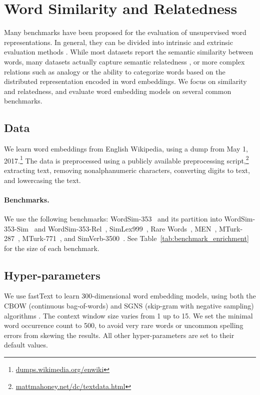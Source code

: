 \documentclass[11pt,a4paper]{article}
\begin{document}
    \section{Word Similarity and Relatedness}\label{sec:benchmarks}
    
    Many benchmarks have been proposed for the evaluation of unsupervised word
    representations.
    In general, they can be divided into intrinsic and extrinsic evaluation methods
    \cite{schnabel2015evaluation,chiu2016intrinsic,jastrzebski2017evaluate,alshargi2018concept2vec,bakarov2018survey}.
    While most datasets report the semantic similarity between words,
    many datasets actually capture semantic relatedness
    \cite{hill2015simlex,avraham2016improving},
    or more complex relations such as analogy or the ability to categorize
    words based on the distributed representation encoded in word embeddings.
    We focus on similarity and relatedness, and evaluate word embedding models
    on several common benchmarks.
    
    \subsection{Data}\label{sec:data}
    We learn word embeddings from English Wikipedia,
    using a dump from May 1, 2017.\footnote{\url{dumps.wikimedia.org/enwiki}}
    The data is preprocessed using a publicly available preprocessing
    script,\footnote{\url{mattmahoney.net/dc/textdata.html}}
    extracting text, removing nonalphanumeric characters,
    converting digits to text, and lowercasing the text.
    
    \paragraph{Benchmarks.}
    
    We use the following benchmarks:
     WordSim-353~\cite{finkelstein2001placing} and its partition into
     WordSim-353-Sim~\cite{agirre2009study} and
     WordSim-353-Rel~\cite{zesch2008using},
     SimLex999~\cite{hill2015simlex},
     Rare Words~\cite[RW; ][]{luong2013better},
     MEN~\cite{bruni2012distributional},
     MTurk-287~\cite{radinsky2011word},
     MTurk-771~\cite{halawi2012large}, and
     SimVerb-3500~\cite{Gerz2016emnlp}.
    See Table~\ref{tab:benchmark_enrichment} for the size of each benchmark.
    
    \subsection{Hyper-parameters}\label{sec:hyperparams}
    We use fastText \cite{bojanowski2016enriching} to learn
    300-dimensional word embedding models,
    using both the CBOW (continuous bag-of-words) and
    SGNS (skip-gram with negative sampling) algorithms \cite{mikolov2013efficient}.
    The context window size varies from 1 up to 15.
    We set the minimal word occurrence count to 500, to avoid
    very rare words or uncommon spelling errors from skewing the results.
    All other hyper-parameters are set to their default values.
    
\end{document}
